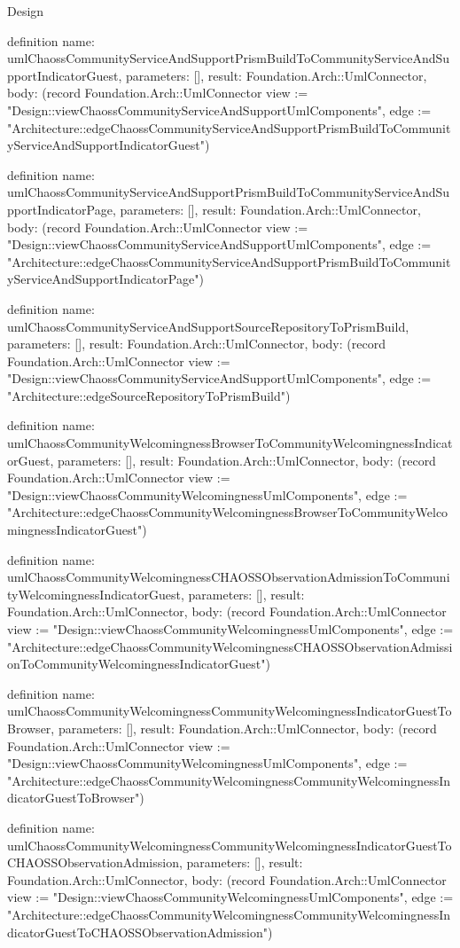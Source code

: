 \begin{lexlean}{Design}
\begin{semanticmodule}
definition{
  name: umlChaossCommunityServiceAndSupportPrismBuildToCommunityServiceAndSupportIndicatorGuest,
  parameters: [],
  result: Foundation.Arch::UmlConnector,
  body: (record Foundation.Arch::UmlConnector {view := "Design::viewChaossCommunityServiceAndSupportUmlComponents", edge := "Architecture::edgeChaossCommunityServiceAndSupportPrismBuildToCommunityServiceAndSupportIndicatorGuest"})
}

definition{
  name: umlChaossCommunityServiceAndSupportPrismBuildToCommunityServiceAndSupportIndicatorPage,
  parameters: [],
  result: Foundation.Arch::UmlConnector,
  body: (record Foundation.Arch::UmlConnector {view := "Design::viewChaossCommunityServiceAndSupportUmlComponents", edge := "Architecture::edgeChaossCommunityServiceAndSupportPrismBuildToCommunityServiceAndSupportIndicatorPage"})
}

definition{
  name: umlChaossCommunityServiceAndSupportSourceRepositoryToPrismBuild,
  parameters: [],
  result: Foundation.Arch::UmlConnector,
  body: (record Foundation.Arch::UmlConnector {view := "Design::viewChaossCommunityServiceAndSupportUmlComponents", edge := "Architecture::edgeSourceRepositoryToPrismBuild"})
}

definition{
  name: umlChaossCommunityWelcomingnessBrowserToCommunityWelcomingnessIndicatorGuest,
  parameters: [],
  result: Foundation.Arch::UmlConnector,
  body: (record Foundation.Arch::UmlConnector {view := "Design::viewChaossCommunityWelcomingnessUmlComponents", edge := "Architecture::edgeChaossCommunityWelcomingnessBrowserToCommunityWelcomingnessIndicatorGuest"})
}

definition{
  name: umlChaossCommunityWelcomingnessCHAOSSObservationAdmissionToCommunityWelcomingnessIndicatorGuest,
  parameters: [],
  result: Foundation.Arch::UmlConnector,
  body: (record Foundation.Arch::UmlConnector {view := "Design::viewChaossCommunityWelcomingnessUmlComponents", edge := "Architecture::edgeChaossCommunityWelcomingnessCHAOSSObservationAdmissionToCommunityWelcomingnessIndicatorGuest"})
}

definition{
  name: umlChaossCommunityWelcomingnessCommunityWelcomingnessIndicatorGuestToBrowser,
  parameters: [],
  result: Foundation.Arch::UmlConnector,
  body: (record Foundation.Arch::UmlConnector {view := "Design::viewChaossCommunityWelcomingnessUmlComponents", edge := "Architecture::edgeChaossCommunityWelcomingnessCommunityWelcomingnessIndicatorGuestToBrowser"})
}

definition{
  name: umlChaossCommunityWelcomingnessCommunityWelcomingnessIndicatorGuestToCHAOSSObservationAdmission,
  parameters: [],
  result: Foundation.Arch::UmlConnector,
  body: (record Foundation.Arch::UmlConnector {view := "Design::viewChaossCommunityWelcomingnessUmlComponents", edge := "Architecture::edgeChaossCommunityWelcomingnessCommunityWelcomingnessIndicatorGuestToCHAOSSObservationAdmission"})
}


\end{semanticmodule}
\end{lexlean}
